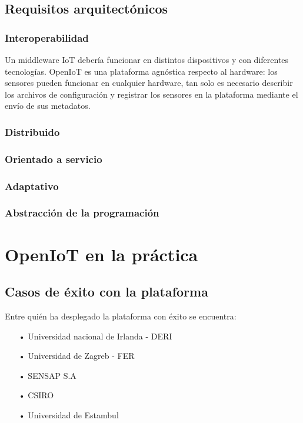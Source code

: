 \documentclass[12pt, twoside]{book}
\begin{document}
\subsection{Requisitos arquitectónicos}
\subsubsection*{Interoperabilidad}
Un middleware IoT debería funcionar en distintos dispositivos y con diferentes tecnologías. OpenIoT es una plataforma agnóstica respecto al hardware: los sensores pueden funcionar en cualquier hardware, tan solo es necesario describir los archivos de configuración y registrar los sensores en la plataforma mediante el envío de sus metadatos.  

\subsubsection*{Distribuido}


\subsubsection*{Orientado a servicio}


\subsubsection*{Adaptativo}

\subsubsection*{Abstracción de la programación}

\section{OpenIoT en la práctica}

\subsection{Casos de éxito con la plataforma}
Entre quién ha desplegado la plataforma con éxito se encuentra:
\begin{itemize}
\item[•] Universidad nacional de Irlanda - DERI
\item[•] Universidad de Zagreb - FER
\item[•] SENSAP S.A
\item[•] CSIRO
\item[•] Universidad de Estambul
\end{itemize}
\end{document}
